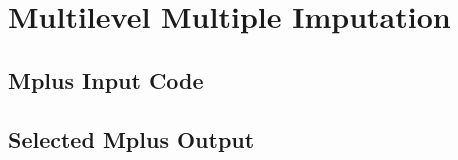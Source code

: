\chapter{Multilevel Multiple Imputation}
\label{app:MMI}

\section{\textsf{Mplus} Input Code}
\label{sec:MMI_inp}

\begin{singlespacing}
    
\end{singlespacing}

\section{Selected \textsf{Mplus} Output}
\label{sec:MMI_out}

\begin{singlespacing}
    
\end{singlespacing}






